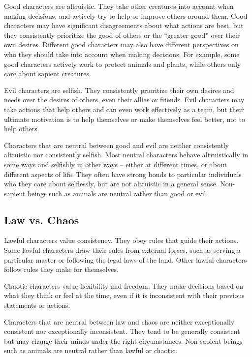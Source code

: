          Good characters are altruistic.
        They take other creatures into account when making decisions, and actively try to help or improve others around them.
        Good characters may have significant disagreements about what actions are best, but they consistently prioritize the good of others or the ``greater good'' over their own desires.
        Different good characters may also have different perspectives on who they should take into account when making decisions.
        For example, some good characters actively work to protect animals and plants, while others only care about sapient creatures.

         Evil characters are selfish.
        They consistently prioritize their own desires and needs over the desires of others, even their allies or friends.
        Evil characters may take actions that help others and can even work effectively as a team, but their ultimate motivation is to help themselves or make themselves feel better, not to help others.

         Characters that are neutral between good and evil are neither consistently altruistic nor consistently selfish.
        Most neutral characters behave altruistically in some ways and selfishly in other ways -- either at different times, or about different aspects of life.
        They often have strong bonds to particular individuals who they care about selflessly, but are not altruistic in a general sense.
        Non-sapient beings such as animals are neutral rather than good or evil.

    \subsection{Law vs. Chaos}
         Lawful characters value consistency.
        They obey rules that guide their actions.
        Some lawful characters draw their rules from external forces, such as serving a particular master or following the legal laws of the land.
        Other lawful characters follow rules they make for themselves.

         Chaotic characters value flexibility and freedom.
        They make decisions based on what they think or feel at the time, even if it is inconsistent with their previous statements or actions.

         Characters that are neutral between law and chaos are neither exceptionally consistent nor exceptionally inconsistent.
        They tend to be generally consistent but may change their minds under the right circumstances.
        Non-sapient beings such as animals are neutral rather than lawful or chaotic.

